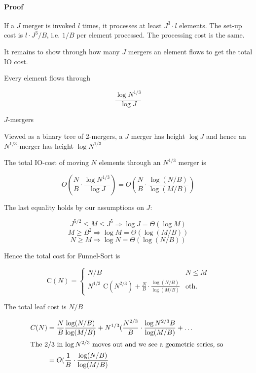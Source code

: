 \paragraph{Proof} If a $J$ merger is invoked $l$ times, it processes at least $J^3\cdot l$ elements. The set-up cost is $l\cdot J^3/B$, i.e. $1/B$ per element processed. The processing cost is the same.

It remains to show through how many $J$ mergers an element flows to get the total IO cost.

\begin{lem} Every element flows through

\[\frac{\log N^{1/3}}{\log J}\]

$J$-mergers
\end{lem}

\begin{pr} Viewed as a binary tree of 2-mergers, a $J$ merger has height $\log J$ and hence an $N^{1/3}$-merger has height $\log N^{1/3}$\end{pr}

\begin{thm} The total IO-cost of moving $N$ elements through an $N^{1/3}$ merger is

\[O(\frac NB \cdot \frac{\log N^{1/3}}{\log J}) = O(\frac NB \cdot \frac{\log (N/B)}{\log (M/B)})\]
\end{thm}

The last equality holds by our assumptions on $J$:

\[J^{5/2} \leq M \leq J^5 \Rightarrow \log J = \Theta(\log M)\]
\[M\geq B^2 \Rightarrow \log M = \Theta(\log (M/B))\]
\[N\geq M \Rightarrow \log N = \Theta(\log (N/B))\]

Hence the total cost for Funnel-Sort is

\[\text{C}(N) = \begin{cases}
N/B & N\leq M\\
N^{1/3} \text{ C}(N^{2/3}) + \frac{N}{B} \cdot \frac{\log (N/B)}{\log (M/B)} & \text{oth.}
\end{cases}\]

The total leaf cost is $N/B$

\begin{align*}
C(N) &= \frac NB \frac{\log (N/B)}{\log (M/B)} + N^{1/3} (\frac{N^{2/3}}{B} \cdot \frac{\log N^{2/3}B}{\log (M/B)} + \ldots\\
\intertext{The $2/3$ in $\log N^{2/3}$ moves out and we see a geometric series, so }
&=O(\frac{1}{B}\cdot \frac{\log (N/B)}{\log (M/B)}
\end{align*}
